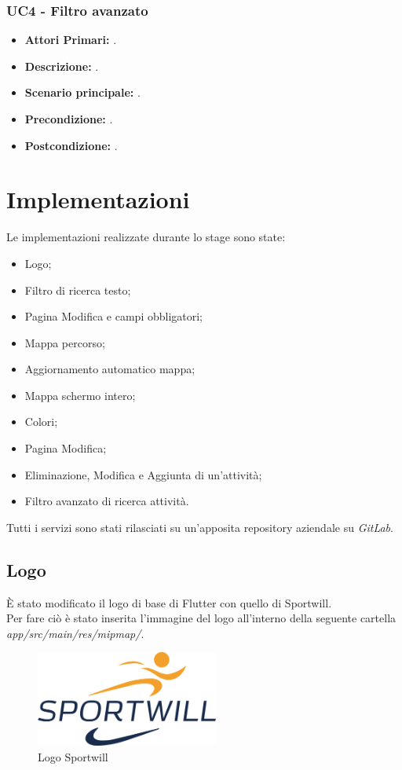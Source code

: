 \subsubsection{ UC4 - Filtro avanzato}
\begin{itemize}
	\item\textbf{Attori Primari:} .
	\item\textbf{Descrizione:} .
	\item\textbf{Scenario principale:} .
	\item\textbf{Precondizione:} .
	\item\textbf{Postcondizione:} .
\end{itemize}

\newpage

\section{Implementazioni}

Le implementazioni realizzate durante lo stage sono state: 
\begin{itemize}
	\item Logo;
	\item Filtro di ricerca testo;
	\item Pagina Modifica e campi obbligatori;
	\item Mappa percorso;
	\item Aggiornamento automatico mappa;
	\item Mappa schermo intero;
	\item Colori;
	\item Pagina Modifica;
	\item Eliminazione, Modifica e Aggiunta di un'attività;
	\item Filtro avanzato di ricerca attività.
\end{itemize}
Tutti i servizi sono stati rilasciati su un'apposita repository aziendale su \textit{GitLab}.

\subsection{Logo}
È stato modificato il logo di base di Flutter con quello di Sportwill.\\
Per  fare ciò è stato inserita l'immagine del logo all'interno della seguente cartella \textit{app/src/main/res/mipmap/}.\\

\begin{figure}[htbp]	
	\centering
	\includegraphics[width=6cm]{immagini/logosportwill.png}
	\caption{Logo Sportwill}
	\label{fig:Logo Sportwill}
\end{figure}

